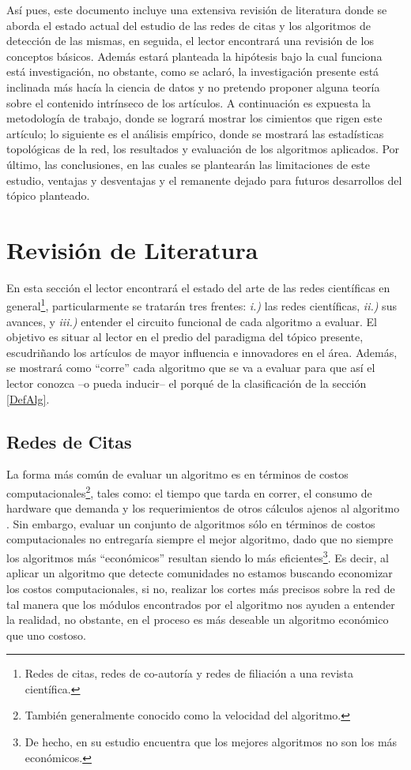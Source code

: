 \documentclass[12pt,letter]{article}
\begin{document}
Así pues, este documento incluye una extensiva revisión de literatura donde se aborda el estado actual del estudio de las redes de citas y los algoritmos de detección de las mismas, en seguida, el lector encontrará una revisión de los conceptos básicos. Además estará planteada la hipótesis bajo la cual funciona está investigación, no obstante, como se aclaró, la investigación presente está inclinada más hacía la ciencia de datos y no pretendo proponer alguna teoría sobre el contenido intrínseco de los artículos. A continuación es expuesta la metodología de trabajo, donde se logrará mostrar los cimientos que rigen este artículo; lo siguiente es el análisis empírico, donde se mostrará las estadísticas topológicas de la red, los resultados y evaluación de los algoritmos aplicados. Por último, las conclusiones, en las cuales se plantearán las limitaciones de este estudio, ventajas y desventajas y el remanente dejado para futuros desarrollos del tópico planteado.


\section{Revisión de Literatura}

En esta sección el lector encontrará el estado del arte de las redes científicas en general\footnote{Redes de citas, redes de co-autoría y redes de filiación a una revista científica.}, particularmente se tratarán tres frentes: \emph{i.)} las redes científicas, \emph{ii.)} sus avances, y \emph{iii.)} entender el circuito funcional de cada algoritmo a evaluar. El objetivo es situar al lector en el predio del paradigma del tópico presente, escudriñando los artículos de mayor influencia e innovadores en el área. Además, se mostrará como ``corre'' cada algoritmo que se va a evaluar para que así el lector conozca --o pueda inducir-- el porqué de la clasificación de la sección \ref{DefAlg}.


\subsection{Redes de Citas} \label{RedCitas}

La forma más común de evaluar un algoritmo es en términos de costos computacionales\footnote{También generalmente conocido como la velocidad del algoritmo.}, tales como: el tiempo que tarda en correr, el consumo de hardware que demanda y los requerimientos de otros cálculos ajenos al algoritmo \citep{Danon}. Sin embargo, evaluar un conjunto de algoritmos sólo en términos de costos computacionales no entregaría siempre el mejor algoritmo, dado que no siempre los algoritmos más ``económicos'' resultan siendo lo más eficientes\footnote{De hecho, \cite{Danon} en su estudio encuentra que los mejores algoritmos no son los más económicos.}. Es decir, al aplicar un algoritmo que detecte comunidades no estamos buscando economizar los costos computacionales, si no, realizar los cortes más precisos sobre la red de tal manera que los módulos encontrados por el algoritmo nos ayuden a entender la realidad, no obstante, en el proceso es más deseable un algoritmo económico que uno costoso.
\end{document}
